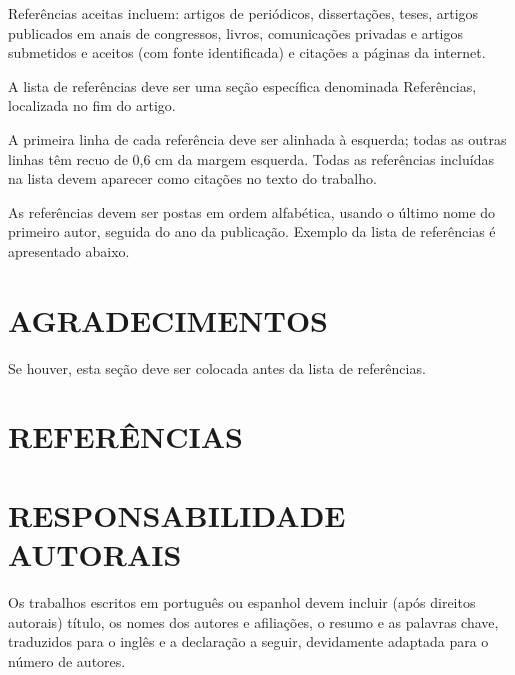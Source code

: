 \documentclass[10pt,fleqn,a4paper]{article}
\begin{document}
        
        
        Referências aceitas incluem: artigos de periódicos, dissertações, teses, artigos publicados em anais de congressos, livros, comunicações privadas e artigos submetidos e aceitos (com fonte identificada) e citações a páginas da internet.

        A lista de referências deve ser uma seção específica denominada Referências, localizada no fim do artigo.

        A primeira linha de cada referência deve ser alinhada à esquerda; todas as outras linhas têm recuo de 0,6 cm da margem esquerda. Todas as referências incluídas na lista devem aparecer como citações no texto do trabalho.

        As referências devem ser postas em ordem alfabética, usando o último nome do primeiro autor, seguida do ano da publicação. Exemplo da lista de referências é apresentado abaixo.


    \section{AGRADECIMENTOS}
    
        Se houver, esta seção deve ser colocada antes da lista de referências.


    \section{REFERÊNCIAS}
        
        

    \section{RESPONSABILIDADE AUTORAIS}

        Os trabalhos escritos em português ou espanhol devem incluir (após direitos autorais) título, os nomes dos autores e afiliações, o resumo e as palavras chave, traduzidos para o inglês e a declaração a seguir, devidamente adaptada para o número de autores.
    
\end{document}
